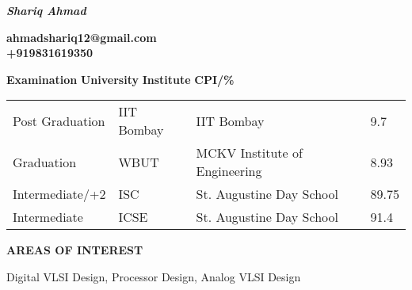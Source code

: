 \documentclass{article}
\def\vsp{6pt}
\begin{document}
\begin{frame}
  \centering \LARGE
  \emph{\textbf{Shariq Ahmad}}\\
\end{frame}

\begin{frame}
   \centering
  \textbf{ahmadshariq12@gmail.com}\\
  \textbf{+919831619350}\\
\end{frame}
 \begin{theorem}
\textbf{Examination}  \hspace{1.2cm} \textbf{University}  \hspace{1.2 cm} \textbf{Institute}    \hspace{3.8cm}  \textbf{CPI/\%} 
 \end{theorem}
 \vspace{-3mm}
\renewcommand{\tabcolsep}{5mm}
\begin{table}[htb]
\begin{tabular}{llll}
Post Graduation & IIT Bombay & IIT Bombay                    & 9.7   \\
Graduation      & WBUT       & MCKV Institute of Engineering & 8.93  \\
Intermediate/+2 & ISC        & St. Augustine Day School      & 89.75 \\
Intermediate   & ICSE       & St. Augustine Day School      &   91.4 
\vspace{-3mm}
\end{tabular}
\end{table}
   \begin{theorem}
   \vspace{-0.7mm}
\begin{center}
\textbf{ AREAS OF INTEREST
}\end{center}  
\vspace{-0.7mm}    
   \end{theorem}
\vspace{-3mm}
\vspace{\vsp}
\hspace{6mm} Digital VLSI Design, Processor Design, Analog VLSI Design
\end{document}
